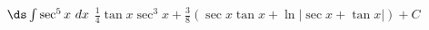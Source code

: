{$\ds \int \sec^5x\ dx$}
{$\frac14\tan x\sec^3x + \frac38\left(\sec x \tan x+\ln |\sec x+\tan x|\right)  +C$}
